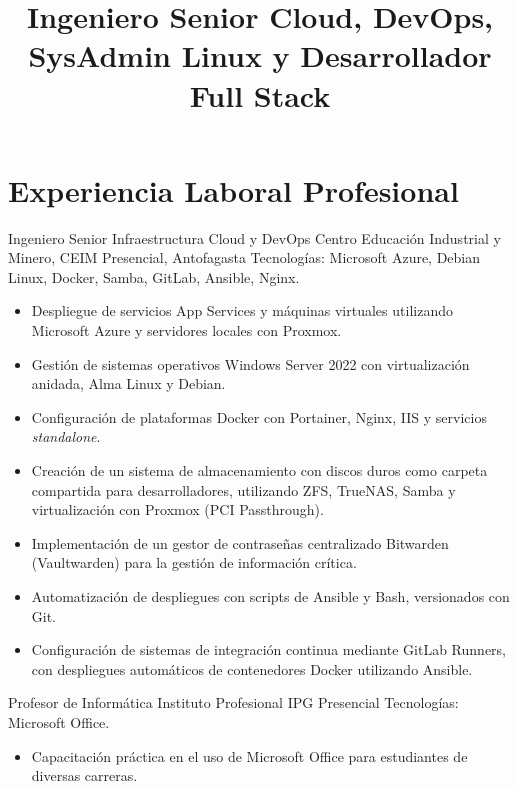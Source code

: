 \documentclass[12pt,letterpaper,sans]{moderncv}
\title {Ingeniero Senior Cloud, DevOps, SysAdmin Linux y Desarrollador Full Stack}
\begin{document}
\makecvtitle

\section{Experiencia Laboral Profesional}

{Ingeniero Senior Infraestructura Cloud y DevOps}
{Centro Educación Industrial y Minero, CEIM}
{\newline Presencial, Antofagasta}
{\newline Tecnologías: Microsoft Azure, Debian Linux, Docker, Samba, GitLab, Ansible, Nginx.}
{
  \begin{itemize}
    \item Despliegue de servicios App Services y máquinas virtuales utilizando Microsoft Azure y servidores locales con Proxmox.
    \item Gestión de sistemas operativos Windows Server 2022 con virtualización anidada, Alma Linux y Debian.
    \item Configuración de plataformas Docker con Portainer, Nginx, IIS y servicios \textit{standalone}.
    \item Creación de un sistema de almacenamiento con discos duros como carpeta compartida para desarrolladores, utilizando ZFS, TrueNAS, Samba y virtualización con Proxmox (PCI Passthrough).
    \item Implementación de un gestor de contraseñas centralizado Bitwarden (Vaultwarden) para la gestión de información crítica.
    \item Automatización de despliegues con scripts de Ansible y Bash, versionados con Git.
    \item Configuración de sistemas de integración continua mediante GitLab Runners, con despliegues automáticos de contenedores Docker utilizando Ansible.
  \end{itemize}
}
\vspace{0.5em}

{Profesor de Informática}
{Instituto Profesional IPG}
{\newline Presencial}
{\newline Tecnologías: Microsoft Office.}
{
  \begin{itemize}
    \item Capacitación práctica en el uso de Microsoft Office para estudiantes de diversas carreras.
  \end{itemize}
}
\vspace{0.5em}
\end{document}
